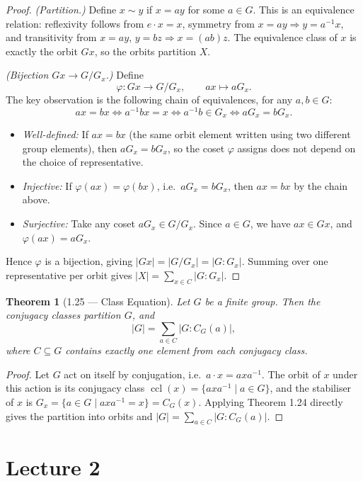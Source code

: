 \documentclass[12pt]{article}
\newtheorem{theorem}{Theorem}
\begin{document}
\begin{proof}
\textit{(Partition.)} Define $x \sim y$ if $x = ay$ for some $a \in G$. This is an equivalence relation: reflexivity follows from $e \cdot x = x$, symmetry from $x = ay \Rightarrow y = a^{-1}x$, and transitivity from $x = ay,\, y = bz \Rightarrow x = (ab)z$. The equivalence class of $x$ is exactly the orbit $Gx$, so the orbits partition $X$.

\textit{(Bijection $Gx \to G/G_x$.)} Define
\[
  \varphi : Gx \to G/G_x, \qquad ax \mapsto aG_x.
\]
The key observation is the following chain of equivalences, for any $a, b \in G$:
\[
  ax = bx \iff a^{-1}bx = x \iff a^{-1}b \in G_x \iff aG_x = bG_x.
\]
\begin{itemize}
  \item \textit{Well-defined:} If $ax = bx$ (the same orbit element written using two different group elements), then $aG_x = bG_x$, so the coset $\varphi$ assigns does not depend on the choice of representative.
  \item \textit{Injective:} If $\varphi(ax) = \varphi(bx)$, i.e.\ $aG_x = bG_x$, then $ax = bx$ by the chain above.
  \item \textit{Surjective:} Take any coset $aG_x \in G/G_x$. Since $a \in G$, we have $ax \in Gx$, and $\varphi(ax) = aG_x$.
\end{itemize}
Hence $\varphi$ is a bijection, giving $|Gx| = |G/G_x| = |G : G_x|$. Summing over one representative per orbit gives $|X| = \sum_{x \in C} |G : G_x|$.
\end{proof}


\begin{theorem}[1.25 — Class Equation]
Let $G$ be a finite group. Then the conjugacy classes partition $G$, and
\[
  |G| = \sum_{a \in C} |G : C_G(a)|,
\]
where $C \subseteq G$ contains exactly one element from each conjugacy class.
\end{theorem}

\begin{proof}
Let $G$ act on itself by conjugation, i.e.\ $a \cdot x = axa^{-1}$. The orbit of $x$ under this action is its conjugacy class $\operatorname{ccl}(x) = \{axa^{-1} \mid a \in G\}$, and the stabiliser of $x$ is $G_x = \{a \in G \mid axa^{-1} = x\} = C_G(x)$. Applying Theorem 1.24 directly gives the partition into orbits and $|G| = \sum_{a \in C} |G : C_G(a)|$.
\end{proof}


\section*{Lecture 2}
\end{document}
